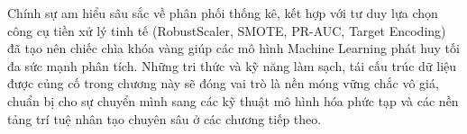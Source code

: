 Chính sự am hiểu sâu sắc về phân phối thống kê, kết hợp với tư duy lựa chọn công cụ tiền xử lý tinh tế (RobustScaler, SMOTE, PR-AUC, Target Encoding) đã tạo nên chiếc chìa khóa vàng giúp các mô hình Machine Learning phát huy tối đa sức mạnh phân tích. Những tri thức và kỹ năng làm sạch, tái cấu trúc dữ liệu được củng cố trong chương này sẽ đóng vai trò là nền móng vững chắc vô giá, chuẩn bị cho sự chuyển mình sang các kỹ thuật mô hình hóa phức tạp và các nền tảng trí tuệ nhân tạo chuyên sâu ở các chương tiếp theo.
